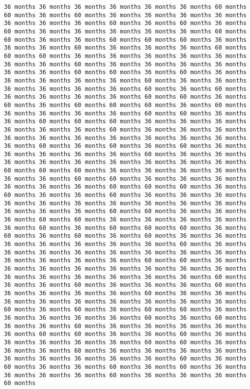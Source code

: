 \documentclass[11pt]{article}
\begin{document}
\begin{Verbatim}[commandchars=\\\{\}, frame=single, framerule=2mm, rulecolor=\color{outerrorbackground}]
36 months 36 months 36 months 36 months 36 months 36 months 60 months 60 months 36 months 60 months 36 months 36 months 36 months 36 months 36 months 36 months 36 months 60 months 36 months 60 months 36 months 60 months 36 months 36 months 36 months 36 months 36 months 60 months 60 months 36 months 36 months 60 months 60 months 60 months 36 months 36 months 36 months 60 months 36 months 36 months 36 months 60 months 60 months 60 months 36 months 36 months 36 months 36 months 36 months 36 months 36 months 60 months 36 months 36 months 36 months 36 months 36 months 36 months 60 months 60 months 36 months 60 months 36 months 36 months 36 months 36 months 36 months 60 months 36 months 36 months 36 months 36 months 36 months 36 months 60 months 36 months 60 months 36 months 36 months 36 months 36 months 60 months 60 months 36 months 60 months 36 months 60 months 60 months 60 months 36 months 60 months 36 months 36 months 36 months 36 months 60 months 60 months 36 months 36 months 60 months 60 months 60 months 36 months 36 months 36 months 36 months 36 months 36 months 60 months 36 months 36 months 36 months 36 months 36 months 36 months 36 months 36 months 36 months 36 months 36 months 60 months 36 months 60 months 36 months 60 months 36 months 36 months 36 months 36 months 36 months 60 months 36 months 36 months 36 months 36 months 36 months 36 months 36 months 36 months 36 months 60 months 60 months 60 months 36 months 36 months 36 months 36 months 36 months 36 months 60 months 60 months 36 months 36 months 36 months 36 months 36 months 36 months 60 months 60 months 60 months 36 months 60 months 36 months 36 months 60 months 36 months 36 months 36 months 36 months 36 months 36 months 36 months 36 months 36 months 36 months 36 months 36 months 36 months 60 months 60 months 36 months 36 months 36 months 60 months 60 months 36 months 36 months 36 months 36 months 36 months 60 months 36 months 60 months 60 months 60 months 36 months 60 months 36 months 60 months 36 months 60 months 36 months 36 months 36 months 36 months 36 months 36 months 36 months 60 months 36 months 36 months 36 months 36 months 36 months 36 months 36 months 36 months 36 months 36 months 36 months 36 months 60 months 60 months 36 months 36 months 36 months 36 months 36 months 36 months 36 months 36 months 36 months 36 months 36 months 36 months 36 months 36 months 60 months 36 months 36 months 60 months 36 months 36 months 36 months 60 months 36 months 36 months 36 months 36 months 60 months 36 months 36 months 36 months 36 months 36 months 36 months 36 months 36 months 36 months 60 months 36 months 60 months 36 months 60 months 60 months 36 months 36 months 36 months 36 months 36 months 60 months 36 months 60 months 36 months 36 months 60 months 36 months 36 months 36 months 36 months 36 months 60 months 60 months 36 months 36 months 60 months 36 months 36 months 36 months 36 months 36 months 60 months 60 months 36 months 36 months 36 months 60 months 36 months 36 months 36 months 36 months 36 months 36 months 36 months 36 months 36 months 60 months 36 months 60 months 36 months 36 months 60 months 36 months 60 months 36 months 36 months 36 months 36 months 60 months 36 months 36 months 36 months 60 months 
\end{Verbatim}
\end{document}
